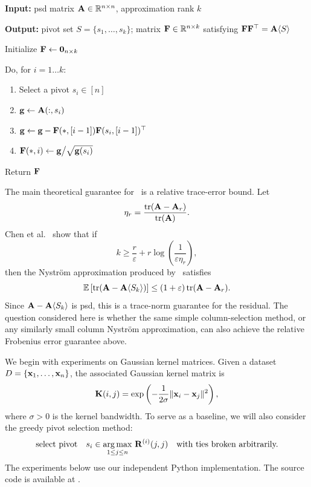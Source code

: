 \begin{algorithm}[H]
    \caption{Pivoted partial Cholesky}
    \label{alg:partial-cholesky}
    \textbf{Input:} {psd matrix $\mathbf{A}\in\mathbb{R}^{n\times n}$, approximation rank $k$}
    
    \smallskip
    \textbf{Output:} {pivot set $S = \{s_1,\ldots, s_k\}$; matrix $\mathbf{F}\in\mathbb{R}^{n\times k}$ satisfying $\mathbf{F}\mathbf{F}^\top = \mathbf{A}\langle S\rangle$}

    \smallskip
    Initialize $\mathbf{F}\gets \mathbf 0_{n\times k}$\;

    \smallskip
    Do, for $i = 1\ldots k$:
    \begin{enumerate}[
    label=\arabic*.,
    leftmargin=2em,
    itemsep=0.35em,
    topsep=0.45em,
    parsep=0pt
]
        \item Select a pivot $s_i\in [n]$
        \item $\mathbf{g}\gets \mathbf{A}(:, s_i)$
        \item $\mathbf{g}\gets \mathbf{g} - \mathbf{F}(*, [i-1])\mathbf{F}(s_i, [i-1])^\top$
        \item $\mathbf{F}(*, i)\gets \mathbf{g} \big / \sqrt{\mathbf{g}(s_i)}$
    \end{enumerate}

    \smallskip
    Return $\mathbf{F}$
\end{algorithm}

The main theoretical guarantee for \RPCholesky\ is a relative trace-error bound. Let
\[
    \eta_r=\frac{\tr(\mathbf{A}-\mathbf{A}_r)}{\tr(\mathbf{A})}.
\]
Chen et al.~\cite{chen_randomly_2025} show that if
\[
    k\geq \frac{r}{\varepsilon}+r\log\left(\frac{1}{\varepsilon\eta_r}\right),
\]
then the Nystr\"om approximation produced by \RPCholesky\ satisfies
\[
    \mathbb{E}\left[\tr(\mathbf{A}-\mathbf{A}\langle S_k\rangle)\right]
    \leq
    (1+\varepsilon)\tr(\mathbf{A}-\mathbf{A}_r).
\]
Since $\mathbf{A}-\mathbf{A}\langle S_k\rangle$ is psd, this is a trace-norm guarantee for the residual. The question considered here is whether the same simple column-selection method, or any similarly small column Nystr\"om approximation, can also achieve the relative Frobenius error guarantee above.

We begin with experiments on Gaussian kernel matrices. Given a dataset $D=\{\mathbf{x}_1,\ldots,\mathbf{x}_n\}$, the associated Gaussian kernel matrix is
\[
    \mathbf{K}(i,j)=\exp\left(-\frac{1}{2\sigma}\|\mathbf{x}_i-\mathbf{x}_j\|^2\right),
\]
where $\sigma>0$ is the kernel bandwidth. To serve as a baseline, we will also consider the greedy pivot selection method:
\[\text{select pivot}\quad s_i \in \operatorname*{arg\,max}_{1\leq j\leq n}\,{\mathbf{R}^{(i)}(j, j)}\quad\text{with ties broken arbitrarily.}\]
The experiments below use our independent Python implementation. The source code is available at \href{\GitHubURL}{\GitHubURL}. 

